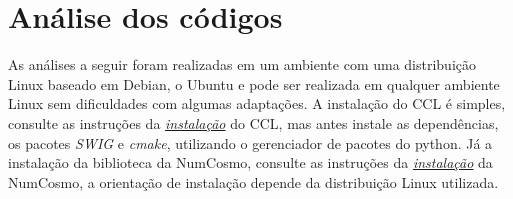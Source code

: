 	\chapter*{Análise dos códigos}

As análises a seguir foram realizadas em um ambiente com uma distribuição Linux baseado em Debian, o Ubuntu e pode ser realizada em qualquer ambiente Linux sem dificuldades com algumas adaptações. A instalação do CCL é simples, consulte as instruções da  \textit{\href{https://ccl.readthedocs.io/en/latest/source/installation.html}{\color{blue}instalação}} do CCL, mas antes instale as dependências, os pacotes \textit{SWIG} e \textit{cmake}, utilizando o gerenciador de pacotes do python. Já a instalação da biblioteca da NumCosmo, consulte as instruções da \textit{\href{https://numcosmo.github.io/download/}{\color{blue}instalação}} da NumCosmo, a orientação de instalação depende da distribuição Linux utilizada.

\begin{comment}		%
\section*{CCL - Core Cosmology Library}
O \href{https://ccl.readthedocs.io/en/latest/?badge=latest#core-cosmology-library}{\color{blue}CCL} ( Core Cosmology Library) é uma biblioteca padronizada de cosmologia que fornece rotinas para computar observáveis cosmológicos básico com alta precisão e foi verificada com um amplo conjunto de testes de validação (\textit{brenchmarks}). As previsões são fornecidas para muitas grandezas cosmológicas, incluindo distâncias, espectro de potência angular, funções de correlação e entre outras  \href{https://arxiv.org/abs/1812.05995}{\color{blue}suportadas}. 

O CCL é escrita em C e Python, com os códigos de cálculo numérico escrito em C e a orientação a objeto escrita em Python, possuindo uma API pública em python sem a necessidade da alteração na interface em C, em um pacote python, o \textit{pyccl}, com módulos intuitivos que permitem computar diversas grandezas cosmológicas suportadas, consulte a   \href{https://ccl.readthedocs.io/en/latest/api/modules.html}{\color{blue}documentação} do CCL.

\section*{NumCosmo}

NumCosmo é uma biblioteca C de software livre cujo objetivo principal é testar modelos cosmológicos usando dados observacionais e fornecer um conjunto de ferramentas para realizar cálculos cosmológicos. A \href{https://numcosmo.github.io/about/}{\color{blue}NumCosmo}  é escrita em C, possui orientação a objeto através do framework \textit{GObject} e\cite{virtualizacao2014} compatibilidade para linguagens que suportam introspecção Gobject, como Python, Perl e entre outros. 
\end{comment}


